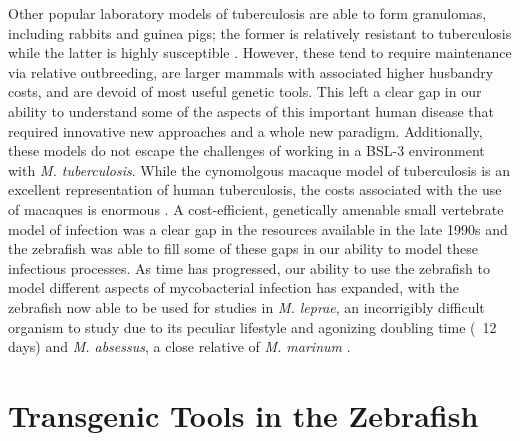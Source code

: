 Other popular laboratory models of tuberculosis are able to form granulomas, including rabbits and guinea pigs; the former is relatively resistant to tuberculosis while the latter is highly susceptible \citep{Clark2014, Dorman2004, Heppleston1949}. However, these tend to require maintenance via relative outbreeding, are larger mammals with associated higher husbandry costs, and are devoid of most useful genetic tools. This left a clear gap in our ability to understand some of the aspects of this important human disease that required innovative new approaches and a whole new paradigm. Additionally, these models do not escape the challenges of working in a BSL-3 environment with \textit{M. tuberculosis}. While the cynomolgous macaque model of tuberculosis is an excellent representation of human tuberculosis, the costs associated with the use of macaques is enormous \citep{Pena2015}. A cost-efficient, genetically amenable small vertebrate model of infection was a clear gap in the resources available in the late 1990s and the zebrafish was able to fill some of these gaps in our ability to model these infectious processes. As time has progressed, our ability to use the zebrafish to model different aspects of mycobacterial infection has expanded, with the zebrafish now able to be used for studies in \textit{M. leprae}, an incorrigibly difficult organism to study due to its peculiar lifestyle and agonizing doubling time (~12 days) \citep{Madigan2017} and \textit{M. absessus}, a close relative of \textit{M. marinum} \citep{Halloum2016, Stinear2008}.

\section{Transgenic Tools in the Zebrafish}\label{transgenics}

